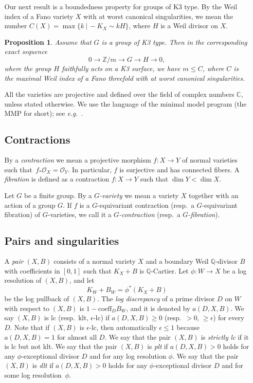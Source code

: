 \documentclass[10pt,a4paper]{article}
\newtheorem{proposition}[thm]{Proposition}
\theoremstyle{definition}
\theoremstyle{remark}
\newcommand{\OOO}{\mathscr{O}}
\newcommand{\lra}{\longrightarrow}
\begin{document}
Our next result is a boundedness property for groups of K3 type.  By the Weil index of a Fano variety $X$ with at worst canonical singularities, we mean the number $C(X)=\max\{ k\ |\, -K_X \sim k H\}$, where $H$ is a Weil divisor on $X$.

\setcounter{thm}{8}

\begin{proposition}
\label{thm-second-main-thm}
Assume that $G$ is a group of K3 type. Then in the corresponding exact sequence\color{black}
\[
0\lra \mathbb{Z}/m\lra G \lra H\lra 0, 
\] 
where the group $H$ faithfully acts on a K3 surface, we have $m\leq C$, where $C$ is  the maximal Weil index of a  Fano threefold with at worst canonical singularities.   
\end{proposition}

\setcounter{section}{2}\setcounter{subsection}{0}

 All the varieties are projective and defined over the field of complex numbers $\mathbb{C}$, unless stated otherwise. We use the language of the minimal model program (the MMP for short); see \textit{e.g.}~\cite{KM98}.

\subsection{Contractions} By a \emph{contraction} we mean a projective
morphism $f\colon X \to Y$ of normal varieties such that~$f_*\OOO_X =
\OOO_Y$. In particular, $f$ is surjective and has connected fibers. A
\emph{fibration} is defined as a contraction $f\colon X\to Y$ such
that $\dim Y<\dim X$.

Let $G$ be a finite group. By a \emph{$G$-variety} we mean a variety
$X$ together with an action of a group $G$. If $f$ is a
$G$-equivariant contraction (resp.\ a $G$-equivariant fibration) of
$G$-varieties, we call it a \emph{$G$-contraction} (resp.\ a
\emph{$G$-fibration}).

\subsection{Pairs and singularities} 
\label{subsec-pairs-sing}
A \emph{pair} $(X, B)$ consists of a normal variety $X$ and a boundary Weil $\mathbb{Q}$-divisor $B$ with coefficients in $[0, 1]$ such that $K_X + B$ is $\mathbb{Q}$-Cartier.  Let $\phi\colon W \to X$ be a log resolution of $(X,B)$, and let
\[
K_W +B_W = \phi^*(K_X +B)
\]
be the log pullback of $(X, B)$.  The \emph{log discrepancy} of a prime divisor $D$ on $W$ with respect to $(X, B)$ is $1 - \mathrm{coeff}_D B_W$, and it is denoted by $a(D, X, B)$. We say $(X, B)$ is lc (resp.\ klt, $\epsilon$-lc) if $a(D, X, B)\geq 0$ (resp.\ $> 0$, $\geq \epsilon$) for every $D$. Note that if $(X, B)$ is $\epsilon$-lc, then automatically $\epsilon \leq 1$ because $a(D, X, B) = 1$ for almost all $D$. We say that the pair $(X, B)$ is \emph{strictly lc} if it is lc but not klt.  We say that the pair $(X,B)$ is \emph{plt} if $a(D, X, B)>0$ holds for any $\phi$-exceptional divisor $D$ and for any log resolution $\phi$.  We say that the pair $(X,B)$ is \emph{dlt} if $a(D, X, B)>0$ holds for any $\phi$-exceptional divisor $D$ and for some log resolution~$\phi$.
\end{document}
